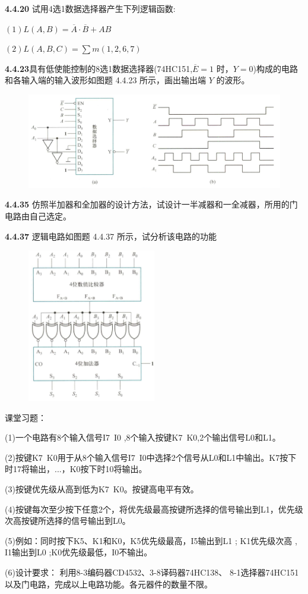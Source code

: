\documentclass[a4paper,11pt,UTF8]{article}
\begin{document}
\textbf{4.4.20} 试用4选1数据选择器产生下列逻辑函数:

$(1)L(A,B)=\overline{A}\cdot\overline{B}+AB$

$(2)L(A,B,C)=\sum m(1,2,6,7)$

\textbf{4.4.23}具有低使能控制的8选1数据选择器(74HC151,$\overline{E}={1}$ 时，$Y={0}$)构成的电路和各输入端的输入波形如图题 4.4.23 所示，画出输出端 $Y$ 的波形。
\begin{figure}[H]
	\centering
	\includegraphics[width=1\textwidth]{4.4.23}
\end{figure}
\textbf{4.4.35} 仿照半加器和全加器的设计方法，试设计一半减器和一全减器，所用的门电路由自己选定。

\textbf{4.4.37} 逻辑电路如图题 4.4.37 所示，试分析该电路的功能
\begin{figure}[H]
	\centering
	\includegraphics[width=0.5\textwidth]{4.4.37}
	\caption{}
\end{figure}
课堂习题：

(1)一个电路有8个输入信号I7~I0 ,8个输入按键K7~K0,2个输出信号L0和L1。

(2)按键K7~K0用于从8个输入信号I7~I0中选择2个信号从L0和L1中输出。K7按下时17将输出，...，K0按下时10将输出。

(3)按键优先级从高到低为K7~K0。按键高电平有效。

(4)按键每次至少按下任意2个，将优先级最高按键所选择的信号输出到L1，优先级次高按键所选择的信号输出到L0。

(5)例如：同时按下K5、K1和K0，K5优先级最高，I5输出到L1 ; K1优先级次高 , I1输出到L0 ;K0优先级最低，I0不输出。

(6)设计要求： 利用8-3编码器CD4532、3-8译码器74HC138、 8-1选择器74HC151以及门电路，完成以上电路功能。各元器件的数量不限。
\end{document}
